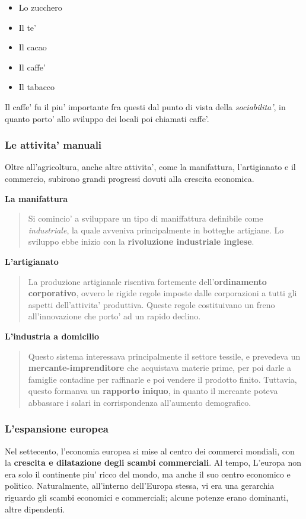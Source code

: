 \documentclass{article}
\begin{document}
{{    \begin{itemize}
      \item Lo zucchero
      \item Il te'
      \item Il cacao
      \item Il caffe'
      \item Il tabacco
    \end{itemize}

    Il caffe' fu il piu' importante fra questi dal punto di vista della \textit{sociabilita'}, in quanto porto' allo sviluppo dei locali poi chiamati caffe'.

    \subsubsection{Le attivita' manuali}
    Oltre all'agricoltura, anche altre attivita', come la manifattura, l'artigianato e il commercio, subirono grandi progressi dovuti alla crescita economica.

    \textbf{La manifattura}
    \begin{quote}
      Si comincio' a sviluppare un tipo di maniffattura definibile come \textit{industriale}, la quale avveniva principalmente in botteghe artigiane. Lo sviluppo ebbe inizio con la \textbf{rivoluzione industriale inglese}.
    \end{quote}

    \textbf{L'artigianato}
    \begin{quote}
      La produzione artigianale risentiva fortemente dell'\textbf{ordinamento corporativo}, ovvero le rigide regole imposte dalle corporazioni a tutti gli aspetti dell'attivita' produttiva. Queste regole costituivano un freno all'innovazione che porto' ad un rapido declino.
    \end{quote}

    \textbf{L'industria a domicilio}
    \begin{quote}
      Questo sistema interessava principalmente il settore tessile, e prevedeva un \textbf{mercante-imprenditore} che acquistava materie prime, per poi darle a famiglie contadine per raffinarle e poi vendere il prodotto finito. Tuttavia, questo formanva un \textbf{rapporto iniquo}, in quanto il mercante poteva abbassare i salari in corrispondenza all'aumento demografico.
    \end{quote}

    \subsubsection{L'espansione europea}
    Nel settecento, l'economia europea si mise al centro dei commerci mondiali, con la \textbf{crescita e dilatazione degli scambi commerciali}. Al tempo, L'europa non era solo il continente piu' ricco del mondo, ma anche il suo centro economico e politico. Naturalmente, all'interno dell'Europa stessa, vi era una gerarchia riguardo gli scambi economici e commerciali; alcune potenze erano dominanti, altre dipendenti.
    
}}
\end{document}
